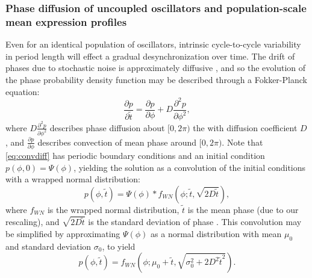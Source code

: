 \subsubsection*{Phase diffusion of uncoupled oscillators and population-scale mean expression profiles}
Even for an identical population of oscillators, intrinsic cycle-to-cycle variability in period length will effect a gradual desynchronization over time.
The drift of phases due to stochastic noise is approximately diffusive \cite{Gonze2002, Gonze2006, Teramae2004, StJohn2014b}, and so the evolution of the phase probability density function may be described through a Fokker-Planck equation:
\begin{equation}\label{eq:convdiff}
    \frac{\partial p}{\partial \tilde{t}} = \frac{\partial p}{\partial \phi} +D\frac{\partial^2 p}{\partial\phi^2},
\end{equation}
where $D\frac{\partial^2 p}{\partial\phi^2}$ describes phase diffusion about $[0,2\pi)$ the with diffusion coefficient $D$, and $\frac{\partial p}{\partial\phi}$ describes convection of mean phase around $[0,2\pi)$.
Note that \eqref{eq:convdiff} has periodic boundary conditions and an initial condition $p(\phi,0) = \Psi(\phi)$, yielding the solution as a convolution of the initial conditions with a wrapped normal distribution:
\begin{equation}\label{eq:convdiffsol}
    p(\phi,\tilde{t}) = \Psi(\phi)*f_{WN}(\phi; \tilde{t}, \sqrt{2D\tilde{t}}),
\end{equation}
where $f_{WN}$ is the wrapped normal distribution, $\tilde{t}$ is the mean phase (due to our rescaling), and $\sqrt{2D\tilde{t}}$ is the standard deviation of phase \cite{StJohn2014b}.
This convolution may be simplified by approximating $\Psi(\phi)$ as a normal distribution with mean $\mu_0$ and standard deviation $\sigma_0$, to yield
\begin{equation}
    p(\phi,\tilde{t}) = f_{WN}(\phi; \mu_0+\tilde{t}, \sqrt{\sigma_0^2 + 2D^2\tilde{t}^2}).
\end{equation}

